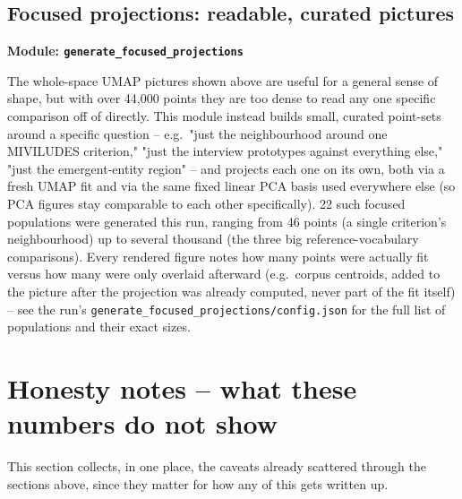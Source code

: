 \documentclass[11pt,a4paper]{article}
\newcommand{\jargon}[1]{\textbf{#1}}
\begin{document}
\subsection{Focused projections: readable, curated pictures}
\jargon{Module: \texttt{generate\_focused\_projections}}

The whole-space UMAP pictures shown above are useful for a general
sense of shape, but with over 44,000 points they are too dense to read
any one specific comparison off of directly. This module instead builds
small, curated point-sets around a specific question -- e.g.\ "just the
neighbourhood around one MIVILUDES criterion," "just the interview
prototypes against everything else," "just the emergent-entity
region" -- and projects each one on its own, both via a fresh UMAP fit
and via the same fixed linear PCA basis used everywhere else (so PCA
figures stay comparable to each other specifically). 22 such focused
populations were generated this run, ranging from 46 points (a single
criterion's neighbourhood) up to several thousand (the three big
reference-vocabulary comparisons). Every rendered figure notes how many
points were actually fit versus how many were only overlaid afterward
(e.g.\ corpus centroids, added to the picture after the projection was
already computed, never part of the fit itself) -- see the run's
\texttt{generate\_focused\_projections/config.json} for the full list of
populations and their exact sizes.

\section{Honesty notes -- what these numbers do not show}

This section collects, in one place, the caveats already scattered
through the sections above, since they matter for how any of this gets
written up.
\end{document}
